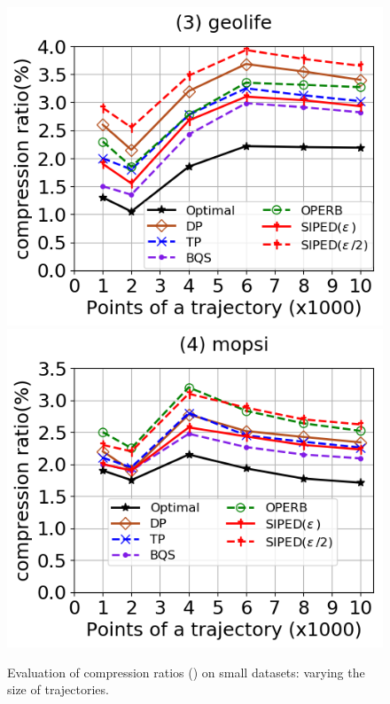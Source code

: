 \begin{figure}[tb!]
	\includegraphics[scale=0.315]{Figures/Exp-PED-CR-size-geolife.png}	\hspace{1ex}
	\includegraphics[scale=0.315]{Figures/Exp-PED-CR-size-mopsi.png}		
	\vspace{-3ex}
	\caption{\small Evaluation of compression ratios (\ped) on small datasets: varying the size of
    trajectories.}
  \label{fig:cr-ped-size}
	\vspace{-2ex}
\end{figure}

